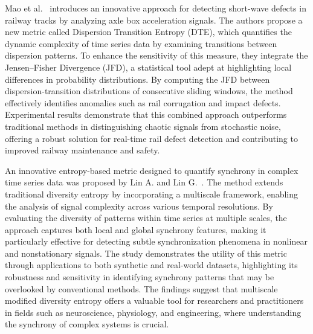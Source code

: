 Mao et al.~\cite{Mao2025} introduces an innovative approach for detecting short-wave defects in railway tracks by analyzing axle box acceleration signals. The authors propose a new metric called Dispersion Transition Entropy (DTE), which quantifies the dynamic complexity of time series data by examining transitions between dispersion patterns. To enhance the sensitivity of this measure, they integrate the Jensen–Fisher Divergence (JFD), a statistical tool adept at highlighting local differences in probability distributions. By computing the JFD between dispersion-transition distributions of consecutive sliding windows, the method effectively identifies anomalies such as rail corrugation and impact defects. Experimental results demonstrate that this combined approach outperforms traditional methods in distinguishing chaotic signals from stochastic noise, offering a robust solution for real-time rail defect detection and contributing to improved railway maintenance and safety.

An innovative entropy-based metric designed to quantify synchrony in complex time series data was proposed by Lin A. and Lin G.~\cite{Lin2025}. The method extends traditional diversity entropy by incorporating a multiscale framework, enabling the analysis of signal complexity across various temporal resolutions. By evaluating the diversity of patterns within time series at multiple scales, the approach captures both local and global synchrony features, making it particularly effective for detecting subtle synchronization phenomena in nonlinear and nonstationary signals. The study demonstrates the utility of this metric through applications to both synthetic and real-world datasets, highlighting its robustness and sensitivity in identifying synchrony patterns that may be overlooked by conventional methods. The findings suggest that multiscale modified diversity entropy offers a valuable tool for researchers and practitioners in fields such as neuroscience, physiology, and engineering, where understanding the synchrony of complex systems is crucial.

